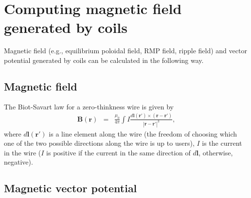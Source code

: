 \documentclass{llncs}
\begin{document}
\section{Computing magnetic field generated by coils}

Magnetic field (e.g., equilibrium poloidal field, RMP field, ripple field) and
vector potential generated by coils can be calculated in the following way.

\subsection{Magnetic field}

The Biot-Savart law for a zero-thinkness wire is given by
\begin{eqnarray}
  \mathbf{B} (\mathbf{r}) & = & \frac{\mu_0}{4 \pi} \int I \frac{d\mathbf{l}
  (\mathbf{r}') \times (\mathbf{r}-\mathbf{r}')}{| \mathbf{r}-\mathbf{r}'
  |^3}, 
\end{eqnarray}
where $d\mathbf{l} (\mathbf{r}')$ is a line element along the wire (the
freedom of choosing which one of the two possible directions along the wire is
up to users), $I$ is the current in the wire ($I$ is positive if the current
in the same direction of $d\mathbf{l}$, otherwise, negative).

\subsection{Magnetic vector potential}
\end{document}
